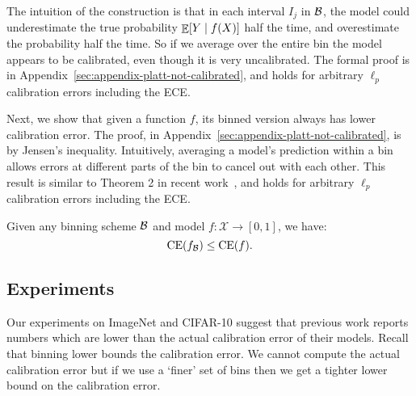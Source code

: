 \begin{example}
\label{ex:continuous-not-calibrated}
\continuousNotCalibratedText{}
\end{example}

\newtheorem*{continuousNotCalibrated}{Restatement of Example~\ref{ex:continuous-not-calibrated}}

The intuition of the construction is that in each interval $I_j$ in $\mathcal{B}{}$, the model could underestimate the true probability $\mathop{\mathbb{E}}[Y \mid f(X)]$ half the time, and overestimate the probability half the time. So if we average over the entire bin the model appears to be calibrated, even though it is very uncalibrated. The formal proof is in Appendix~\ref{sec:appendix-platt-not-calibrated}, and holds for arbitrary $\ell_p$ calibration errors including the ECE.

Next, we show that given a function $f$, its binned version always has lower calibration error. The proof, in Appendix~\ref{sec:appendix-platt-not-calibrated}, is by Jensen's inequality. Intuitively, averaging a model's prediction within a bin allows errors at different parts of the bin to cancel out with each other. This result is similar to Theorem 2 in recent work~\cite{vaicenavicius2019calibration}, and holds for arbitrary $\ell_p$ calibration errors including the ECE.

\newcommand{\binningLowerBoundText}{
  Given any binning scheme $\bins{}$ and model $f : \mathcal{X} \to [0, 1]$, we have:
\[  \ce(f_{\bins{}}) \leq \ce(f). \]
\pl{number the equations}
}

\begin{proposition}
\label{prop:bin_low_bound}
\binningLowerBoundText{}
\end{proposition}

\newtheorem*{binningLowerBound}{Restatement of Proposition~\ref{prop:bin_low_bound}}

\subsection{Experiments}

Our experiments on ImageNet and CIFAR-10 suggest that previous work reports numbers which are lower than the actual calibration error of their models. Recall that binning lower bounds the calibration error. We cannot compute the actual calibration error but if we use a `finer' set of bins then we get a tighter lower bound on the calibration error.

